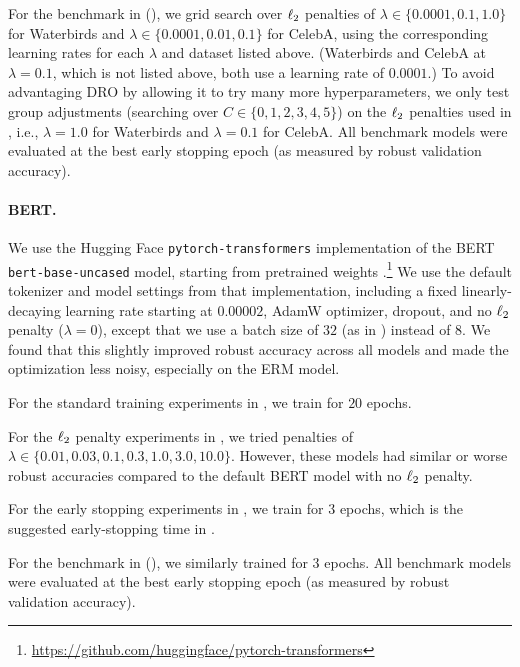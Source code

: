 For the benchmark in  (), we grid search over
$\ell_2$ penalties of $\lambda \in \{0.0001, 0.1, 1.0\}$ for Waterbirds and
$\lambda \in \{0.0001, 0.01, 0.1\}$ for CelebA, using the corresponding learning rates for each $\lambda$ and dataset listed above.
(Waterbirds and CelebA at $\lambda = 0.1$, which is not listed above, both use a learning rate of $0.0001$.)
To avoid advantaging DRO by allowing it to try many more hyperparameters,
we only test group adjustments (searching over $C \in \{0, 1, 2, 3, 4, 5\}$) on the $\ell_2$ penalties used in ,
i.e., $\lambda = 1.0$ for Waterbirds and $\lambda = 0.1$ for CelebA.
All benchmark models were evaluated at the best early stopping epoch (as measured by robust validation accuracy).

\paragraph{BERT.}
We use the Hugging Face \texttt{pytorch-transformers} implementation of the BERT \texttt{bert-base-uncased} model,
starting from pretrained weights \citep{devlin2019bert}.\footnote{\url{https://github.com/huggingface/pytorch-transformers}}
We use the default tokenizer and model settings from that implementation,
including a fixed linearly-decaying learning rate starting at $0.00002$, AdamW optimizer, dropout, and no $\ell_2$ penalty ($\lambda = 0$),
except that we use a batch size of $32$ (as in \citet{devlin2019bert})
instead of $8$.
We found that this slightly improved robust accuracy across all models and made the optimization less noisy, especially on the ERM model.

For the standard training experiments in , we train for $20$ epochs.

For the $\ell_2$ penalty experiments in , we tried penalties of $\lambda \in \{0.01, 0.03, 0.1, 0.3, 1.0, 3.0, 10.0\}$. However, these models had similar or worse robust accuracies compared to the default BERT model with no $\ell_2$ penalty.

For the early stopping experiments in , we train
for $3$ epochs, which is the suggested early-stopping time in \citet{devlin2019bert}.

For the benchmark in  (), we similarly trained for $3$ epochs.
All benchmark models were evaluated at the best early stopping epoch (as measured by robust validation accuracy).

